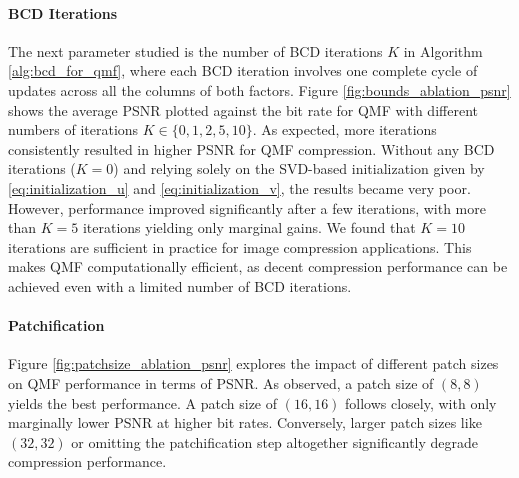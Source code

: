 
\paragraph{BCD Iterations}
The next parameter studied is the number of BCD iterations $K$ in Algorithm \ref{alg:bcd_for_qmf}, where each BCD iteration involves one complete cycle of updates across all the columns of both factors. Figure \ref{fig:bounds_ablation_psnr} shows the average PSNR plotted against the bit rate for QMF with different numbers of iterations $K \in \{0, 1, 2, 5, 10\}$. As expected, more iterations consistently resulted in higher PSNR for QMF compression. Without any BCD iterations ($K=0$) and relying solely on the SVD-based initialization given by \eqref{eq:initialization_u} and \eqref{eq:initialization_v}, the results became very poor. However, performance improved significantly after a few iterations, with more than $K=5$ iterations yielding only marginal gains. We found that $K=10$ iterations are sufficient in practice for image compression applications. This makes QMF computationally efficient, as decent compression performance can be achieved even with a limited number of BCD iterations.

\paragraph{Patchification}
Figure \ref{fig:patchsize_ablation_psnr} explores the impact of different patch sizes on QMF performance in terms of PSNR. As observed, a patch size of $(8, 8)$ yields the best performance. A patch size of $(16, 16)$ follows closely, with only marginally lower PSNR at higher bit rates. Conversely, larger patch sizes like $(32, 32)$ or omitting the patchification step altogether significantly degrade compression performance. 


